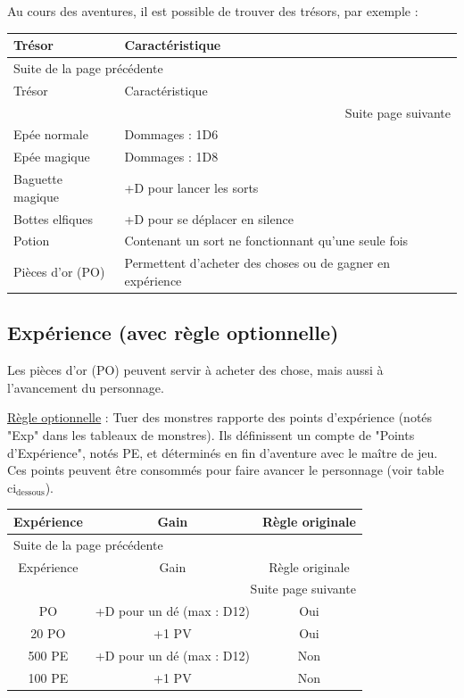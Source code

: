 \documentclass[a4paper, 11pt, twoside]{article}
\begin{document}
Au cours des aventures, il est possible de trouver des trésors, par exemple :

\begin{longtable}{l|l}
Trésor & Caractéristique\\
\hline
\endfirsthead
\multicolumn{2}{l}{Suite de la page précédente} \\
\hline

Trésor & Caractéristique \\

\hline
\endhead
\hline\multicolumn{2}{r}{Suite page suivante} \\
\endfoot
\endlastfoot
\hline
Epée normale & Dommages : 1D6\\
Epée magique & Dommages : 1D8\\
Baguette magique & +D pour lancer les sorts\\
Bottes elfiques & +D pour se déplacer en silence\\
Potion & Contenant un sort ne fonctionnant qu'une seule fois\\
Pièces d'or (PO) & Permettent d'acheter des choses ou de gagner en expérience\\
\end{longtable}

\subsection{Expérience (avec règle optionnelle)}
\label{sec:org624741e}

Les pièces d'or (PO) peuvent servir à acheter des chose, mais aussi à l'avancement du personnage.

\uline{Règle optionnelle} : Tuer des monstres rapporte des points d'expérience (notés "Exp" dans les tableaux de monstres). Ils définissent un compte de "Points d'Expérience", notés PE, et déterminés en fin d'aventure avec le maître de jeu. Ces points peuvent être consommés pour faire avancer le personnage (voir table ci\(_{\text{dessous}}\)).

\begin{longtable}{c|c|c}
Expérience & Gain & Règle originale\\
\hline
\endfirsthead
\multicolumn{3}{l}{Suite de la page précédente} \\
\hline

Expérience & Gain & Règle originale \\

\hline
\endhead
\hline\multicolumn{3}{r}{Suite page suivante} \\
\endfoot
\endlastfoot
\hline
100 PO & +D pour un dé (max : D12) & Oui\\
20 PO & +1 PV & Oui\\
500 PE & +D pour un dé (max : D12) & Non\\
100 PE & +1 PV & Non\\
\end{longtable}
\end{document}
